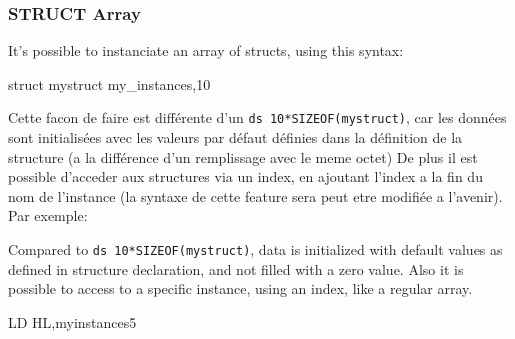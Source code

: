 \begin{xen}
\subsubsection{STRUCT Array}
It's possible to instanciate an array of structs, using this syntax:
\end{xen}

\begin{code}
    struct mystruct my_instances,10
\end{code}

\begin{xfr}
Cette facon de faire est différente d'un \texttt{ds 10*SIZEOF(mystruct)}, car les données sont initialisées avec les valeurs par défaut définies dans la définition de la structure (a la différence d'un remplissage avec le meme octet)
De plus il est possible d'acceder aux structures via un index, en ajoutant l'index a la fin du nom de l'instance (la syntaxe de cette feature sera peut etre modifiée a l'avenir). Par exemple:
\end{xfr}

\begin{xen}
Compared to \texttt{ds 10*SIZEOF(mystruct)}, data is initialized with default values as defined in structure declaration, and not filled with a zero value.
Also it is possible to access to a specific instance, using an index, like a regular array.
\end{xen}
 
\begin{code}
  LD HL,myinstances5 
\end{code}
    